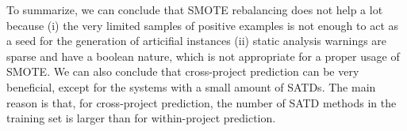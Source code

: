 To summarize, we can conclude that SMOTE rebalancing does not help a lot because (i) the very limited samples of positive examples is not enough to act as a seed for the generation of articifial instances (ii) static analysis warnings are sparse and have a boolean nature, which is not appropriate for a proper usage of SMOTE. We can also conclude that cross-project prediction can be very beneficial, except for the systems with a small amount of SATDs. The main reason is that, for cross-project prediction, the number of SATD methods in the training set is larger than for within-project prediction.

\begin{table*}[t]
	\caption{Top 10 discriminant features (cross-project prediction). (M): source code metrics,  (CS): CheckStyle checks, (P): PMD checks.}
	\label{tab:top10featuresac}
	\centering\scriptsize
	\vspace{-2mm}
\end{table*}

